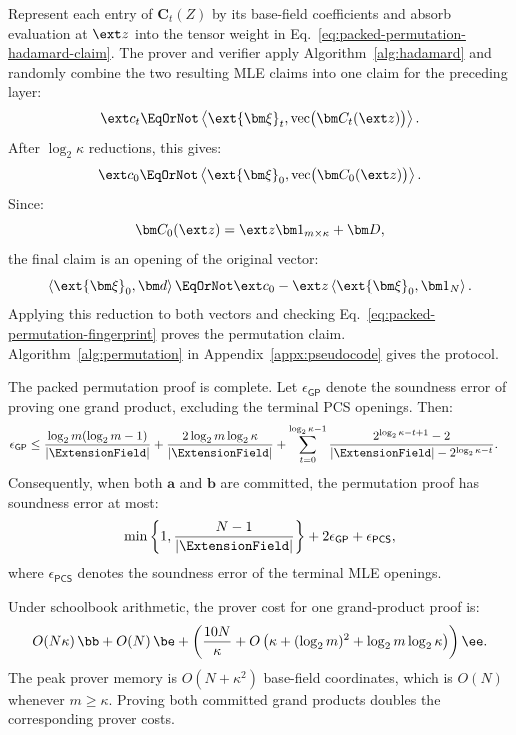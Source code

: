 Represent each entry of \(\bm C_t(Z)\) by its base-field
coefficients and absorb evaluation at \(\ext z\) into the
tensor weight in
Eq.~\eqref{eq:packed-permutation-hadamard-claim}. The prover and
verifier apply Algorithm~\ref{alg:hadamard} and randomly combine
the two resulting MLE claims into one claim for the preceding layer:
\begin{equation*}
    \ext c_t
    \EqOrNot
    \left\langle
        \ext{\bm\xi}_t,
        \operatorname{vec}
        \bigl(\bm C_t(\ext z)\bigr)
    \right\rangle.
\end{equation*}
After \(\log_2\kappa\) reductions, this gives:
\[
    \ext c_0
    \EqOrNot
    \left\langle
        \ext{\bm\xi}_0,
        \operatorname{vec}
        \bigl(\bm C_0(\ext z)\bigr)
    \right\rangle.
\]
Since:
\[
    \bm C_0(\ext z)
    =
    \ext z\bm 1_{m\times\kappa}+\bm D,
\]
the final claim is an opening of the original vector:
\begin{equation*}
    \left\langle
        \ext{\bm\xi}_0,\bm d
    \right\rangle
    \EqOrNot
    \ext c_0
    -
    \ext z
    \left\langle
        \ext{\bm\xi}_0,\bm 1_N
    \right\rangle.
\end{equation*}
Applying this reduction to both vectors and checking
Eq.~\eqref{eq:packed-permutation-fingerprint} proves the permutation
claim. Algorithm~\ref{alg:permutation} in
Appendix~\ref{appx:pseudocode} gives the protocol.

\begin{proposition}
\label{proposition:permutation-complexity}
The packed permutation proof is complete. Let
\(\epsilon_{\mathsf{GP}}\) denote the soundness error of proving
one grand product, excluding the terminal PCS openings. Then:
\[
\begin{aligned}
    \epsilon_{\mathsf{GP}}
    \leq\;&
    \frac{
        \log_2m(\log_2m-1)
    }{
        |\ExtensionField|
    }
    +
    \frac{
        2\log_2m\log_2\kappa
    }{
        |\ExtensionField|
    }
    +
    \sum_{t=0}^{\log_2\kappa-1}
    \frac{
        2^{\log_2\kappa-t+1}-2
    }{
        |\ExtensionField|
        -
        2^{\log_2\kappa-t}
    }.
\end{aligned}
\]
Consequently, when both \(\bm a\) and \(\bm b\) are committed,
the permutation proof has soundness error at most:
\[
    \min\left\{
        1,
        \frac{N-1}{|\ExtensionField|}
    \right\}
    +
    2\epsilon_{\mathsf{GP}}
    +
    \epsilon_{\mathsf{PCS}},
\]
where \(\epsilon_{\mathsf{PCS}}\) denotes the soundness error of
the terminal MLE openings.

Under schoolbook arithmetic, the prover cost for one
grand-product proof is:
\[
    O(N\kappa)\,\bb
    +
    O(N)\,\be
    +
    \left(
        \frac{10N}{\kappa}
        +
        O\left(
            \kappa
            +
            (\log_2m)^2
            +
            \log_2m\log_2\kappa
        \right)
    \right)\ee.
\]
The peak prover memory is \(O(N+\kappa^2)\) base-field
coordinates, which is \(O(N)\) whenever \(m\geq\kappa\).
Proving both committed grand products doubles the corresponding
prover costs.
\end{proposition}

